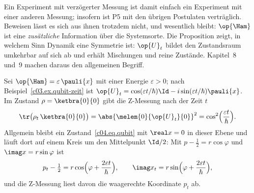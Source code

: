 Ein Experiment mit verzögerter Messung ist damit einfach ein Experiment mit einer anderen Messung;
insofern ist P5 mit den übrigen Postulaten verträglich. Beweisen lässt es sich aus ihnen trotzdem
nicht, und wesentlich bleibt: $\op{\Ham}$ ist eine \emph{zusätzliche} Information über die
Systemsorte. Die Proposition zeigt, in welchem
Sinn Dynamik eine Symmetrie ist: $\op{U}_t$ bildet den Zustandsraum umkehrbar auf sich ab und
erhält Mischungen und reine Zustände. Kapitel~8 und~9 machen daraus den allgemeinen Begriff.

\begin{example}\label{c04.ex.qubit-dynamik}
  Sei $\op{\Ham} = \varepsilon\,\pauli{x}$ mit einer Energie $\varepsilon > 0$; nach
  Beispiel~\ref{c03.ex.qubit-zeit} ist
  $\op{U}_t = \cos(\varepsilon t/\hbar)\Id - i\sin(\varepsilon t/\hbar)\pauli{x}$. Im Zustand
  $\rho = \ketbra{0}{0}$ gibt die Z-Messung nach der Zeit $t$
  \begin{equation}\label{c04.eq.rabi}
    \tr\bigl(\rho_t\,\ketbra{0}{0}\bigr) = \abs{\melem{0}{\op{U}_t}{0}}^2 = \cos^2\Bigl(\frac{\varepsilon t}{\hbar}\Bigr) .
  \end{equation}
  Allgemein bleibt ein Zustand~\eqref{c04.eq.qubit} mit $\real x = 0$ in dieser Ebene und läuft dort
  auf einem Kreis um den Mittelpunkt $\Id/2$: Mit
  $p - \tfrac12 = r\cos\varphi$ und $\imag x = r\sin\varphi$ ist
  \begin{equation}\label{c04.eq.kreis}
    p_t - \tfrac12 = r\cos\Bigl(\varphi + \frac{2\varepsilon t}{\hbar}\Bigr) ,
    \qquad
    \imag x_t = r\sin\Bigl(\varphi + \frac{2\varepsilon t}{\hbar}\Bigr) ,
  \end{equation}
  und die Z-Messung liest davon die waagerechte Koordinate $p_t$ ab.
\end{example}

